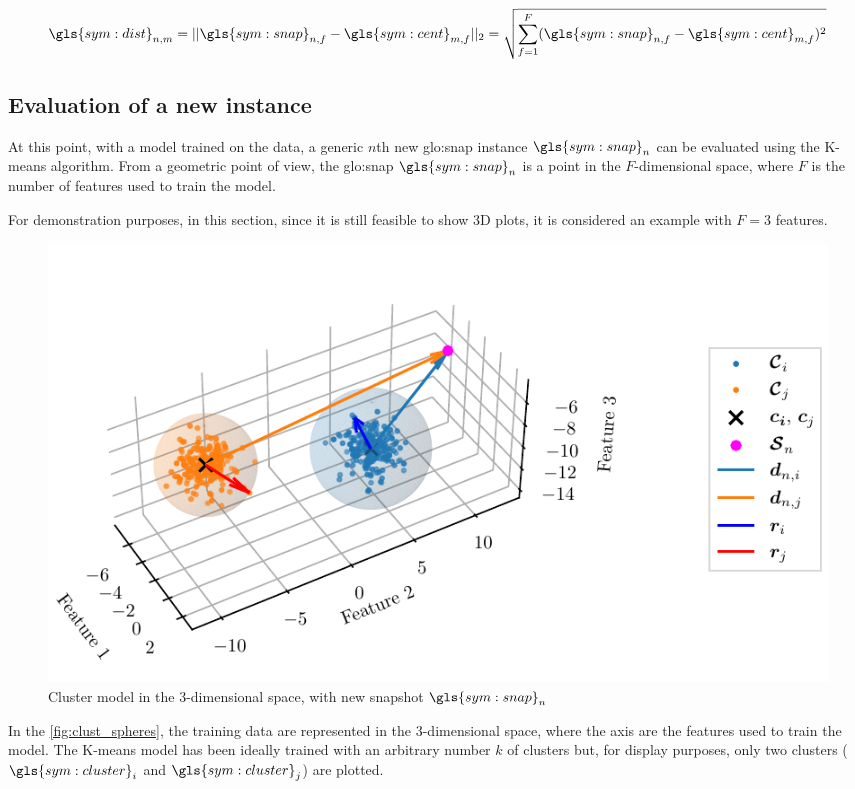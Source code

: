 \begin{equation}
  \label{eq:clust_dist}
  \gls{sym:dist}_{n,m} = ||\gls{sym:snap}_{n,f} - \gls{sym:cent}_{m,f}||_2 = \sqrt{\sum_{f=1}^{F} (\gls{sym:snap}_{n,f} - \gls{sym:cent}_{m,f})^2}
\end{equation}

\subsection{Evaluation of a new instance}

At this point, with a model trained on the data, a generic $n$th new {\gls{glo:snap}} instance $\gls{sym:snap}_n$ can be evaluated using the K-means algorithm.
From a geometric point of view, the {\gls{glo:snap}} $\gls{sym:snap}_n$ is a point in the ${F}$-dimensional space, where ${F}$ is the number of features used to train the model.

For demonstration purposes, in this section, since it is still feasible to show 3D plots, it is considered an example with ${F}=3$ features.

\begin{figure}[htbp]
  \centering
  \includegraphics[width=\textwidth]{images/Kmeans/Spheres_2.pdf}
  \caption{Cluster model in the $3$-dimensional space, with new snapshot $\gls{sym:snap}_n$}
  \label{fig:clust_spheres}
\end{figure}

In the \autoref{fig:clust_spheres}, the training data are represented in the $3$-dimensional space, where the axis are the features used to train the model. The K-means model has been ideally trained with an arbitrary number $k$ of clusters but, for display purposes, only two clusters  ($\gls{sym:cluster}_i$ and $\gls{sym:cluster}_j$) are plotted.
